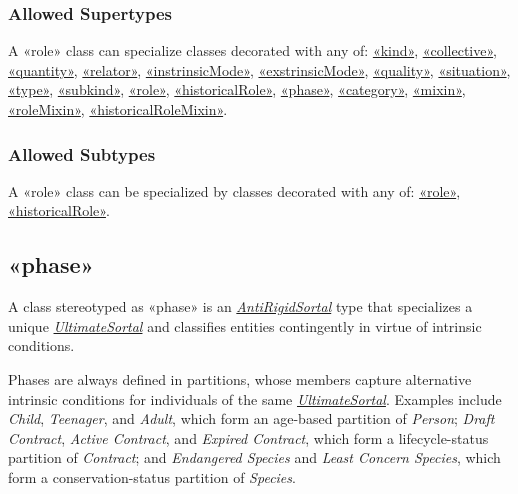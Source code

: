 \subsubsection{Allowed Supertypes}

A «role» class can specialize classes decorated with any of: 
\hyperref[stereotype:kind]{«kind»}, \hyperref[stereotype:collective]{«collective»}, \hyperref[stereotype:quantity]{«quantity»}, \hyperref[stereotype:relator]{«relator»}, \hyperref[stereotype:intrinsicMode]{«instrinsicMode»},
\hyperref[stereotype:extrinsicMode]{«exstrinsicMode»}, \hyperref[stereotype:quality]{«quality»}, \hyperref[stereotype:situation]{«situation»}, \hyperref[stereotype:type]{«type»}, \hyperref[stereotype:subkind]{«subkind»}, \hyperref[stereotype:role]{«role»}, \hyperref[stereotype:historicalRole]{«historicalRole»}, \hyperref[stereotype:role]{«phase»}, \hyperref[stereotype:category]{«category»}, \hyperref[stereotype:mixin]{«mixin»}, \hyperref[stereotype:roleMixin]{«roleMixin»}, \hyperref[stereotype:historicalRoleMixin]{«historicalRoleMixin»}.

\subsubsection{Allowed Subtypes}

A «role» class can be specialized by classes decorated with any of:
\hyperref[stereotype:role]{«role»}, \hyperref[stereotype:historicalRole]{«historicalRole»}.

\subsection{«phase»}
\label{stereotype:phase}

A class stereotyped as «phase» is an \hyperref[stereotype:antiRigidSortal]{\textit{AntiRigidSortal}} type that specializes a unique \hyperref[stereotype:ultimateSortal]{\textit{UltimateSortal}} and classifies entities contingently in virtue of intrinsic conditions.

Phases are always defined in partitions, whose members capture alternative intrinsic conditions for individuals of the same \hyperref[stereotype:ultimateSortal]{\textit{UltimateSortal}}. Examples include \textit{Child}, \textit{Teenager}, and \textit{Adult}, which form an age-based partition of \textit{Person}; \textit{Draft Contract}, \textit{Active Contract}, and \textit{Expired Contract}, which form a lifecycle-status partition of \textit{Contract}; and \textit{Endangered Species} and \textit{Least Concern Species}, which form a conservation-status partition of \textit{Species}.

